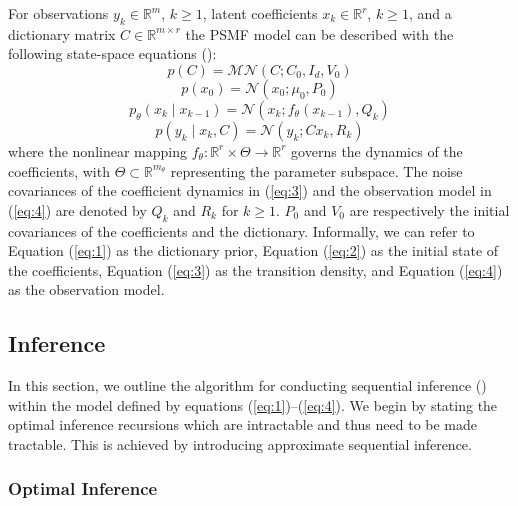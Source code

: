 \documentclass{mldsmsc}
\begin{document}
For observations $y_k \in \mathbb{R}^{m}$, $k \geq 1$, latent coefficients $x_k \in \mathbb{R}^{r}$, $k \geq 1$, and a dictionary matrix $C \in \mathbb{R}^{m \times r}$ the PSMF model can be described with the following state-space equations (\cite{akyildiz2021probabilistic}):
\begin{equation} \label{eq:1}
    p(C) = \mathcal{MN}(C; C_0, I_d, V_0)
\end{equation}
\begin{equation} \label{eq:2}
    p(x_0) = \mathcal{N}(x_0; \mu_0, P_0)
\end{equation}
\begin{equation} \label{eq:3}
    p_{\theta}(x_k \mid x_{k-1}) = \mathcal{N}(x_k; f_{\theta}(x_{k-1}), Q_k)
\end{equation}
\begin{equation} \label{eq:4}
    p(y_k \mid x_k, C) = \mathcal{N}(y_k; Cx_k, R_k)
\end{equation}
where the nonlinear mapping $f_{\theta} : \mathbb{R}^{r} \times \Theta \rightarrow \mathbb{R}^{r}$ governs the dynamics of the coefficients, with $\Theta \subset \mathbb{R}^{m_{\theta}}$ representing the parameter subspace. The noise covariances of the coefficient dynamics in (\ref{eq:3}) and the observation model in (\ref{eq:4}) are denoted by $Q_k$ and $R_k$ for $k \geq 1$. $P_0$ and $V_0$ are respectively the initial covariances of the coefficients and the dictionary. Informally, we can refer to Equation (\ref{eq:1}) as the dictionary prior, Equation (\ref{eq:2}) as the initial state of the coefficients, Equation (\ref{eq:3}) as the transition density, and Equation (\ref{eq:4}) as the observation model.

\subsection{Inference}

In this section, we outline the algorithm for conducting sequential inference (\cite{akyildiz2021probabilistic}) within the model defined by equations (\ref{eq:1})–(\ref{eq:4}). We begin by stating the optimal inference recursions which are intractable and thus need to be made tractable. This is achieved by introducing approximate sequential inference.

\subsubsection{Optimal Inference}
\end{document}
